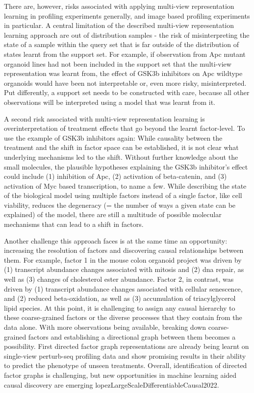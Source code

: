 \begin{flushleft}
There are, however, risks associated with applying multi-view representation learning in profiling experiments generally, and image based profiling experiments in particular. A central limitation of the described multi-view representation learning approach are out of distribution samples - the risk of misinterpreting the state of a sample within the query set that is far outside of the distribution of states learnt from the support set. For example, if observation from Apc mutant organoid lines had not been included in the support set that the multi-view representation was learnt from, the effect of GSK3b inhibitors on Apc wildtype organoids would have been not interpretable or, even more risky, misinterpreted. Put differently, a support set needs to be constructed with care, because all other observations will be interpreted using a model that was learnt from it.
\bigbreak

A second risk associated with multi-view representation learning is overinterpretation of treatment effects that go beyond the learnt factor-level. To use the example of GSK3b inhibitors again: While causality between the treatment and the shift in factor space can be established, it is not clear what underlying mechanisms led to the shift. Without further knowledge about the small molecules, the plausible hypotheses explaining the GSK3b inhibitor's effect could include (1) inhibition of Apc, (2) activation of beta-catenin, and (3) activation of Myc based transcription, to name a few. While describing the state of the biological model using multiple factors instead of a single factor, like cell viability, reduces the degeneracy (= the number of ways a given state can be explained) of the model, there are still a multitude of possible molecular mechanisms that can lead to a shift in factors.
\bigbreak

Another challenge this approach faces is at the same time an opportunity: increasing the resolution of factors and discovering causal relationships between them. For example, factor 1 in the mouse colon organoid project was driven by (1) transcript abundance changes associated with mitosis and (2) dna repair, as well as (3) changes of cholesterol ester abundance. Factor 2, in contrast, was driven by (1) transcript abundance changes associated with cellular senescence, and (2) reduced beta-oxidation, as well as (3) accumulation of triacylglycerol lipid species. At this point, it is challenging to assign any causal hierarchy to these coarse-grained factors or the diverse processes that they contain from the data alone. With more observations being available, breaking down coarse-grained factors and establishing a directional graph between them becomes a possibility. First directed factor graph representations are already being learnt on single-view perturb-seq profiling data and show promising results in their ability to predict the phenotype of unseen treatments. Overall, identification of directed factor graphs is challenging, but new opportunities in machine learning aided causal discovery are emerging lopezLargeScaleDifferentiableCausal2022.
\bigbreak


\end{flushleft}
